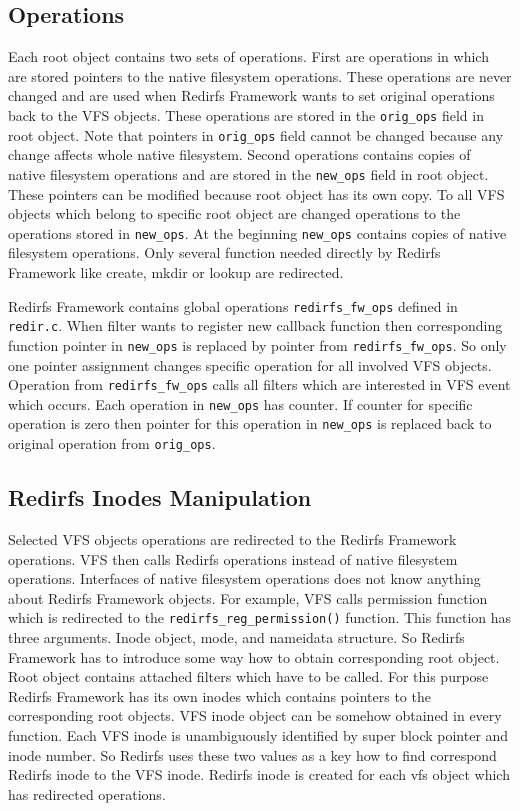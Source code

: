 \subsection{Operations}
Each root object contains two sets of operations. First are operations in which are
stored pointers to the native filesystem operations. These operations are
never changed and are used when Redirfs Framework wants to set original operations
back to the VFS objects. These operations are stored in the \texttt{orig\_ops} field
in root object. Note that pointers in \texttt{orig\_ops} field cannot be changed
because any change affects whole native filesystem. Second operations contains copies
of native filesystem operations and are stored in the \texttt{new\_ops} field in
root object. These pointers can be modified because root object has its own copy. 
To all VFS objects which belong to specific root object are changed operations to the
operations stored in \texttt{new\_ops}. At the beginning \texttt{new\_ops} contains
copies of native filesystem operations. Only several function needed directly by Redirfs
Framework like create, mkdir or lookup are redirected.

Redirfs Framework contains global operations \texttt{redirfs\_fw\_ops} defined in
\texttt{redir.c}. When filter wants to register new callback function then
corresponding function pointer in \texttt{new\_ops} is replaced by pointer
from \texttt{redirfs\_fw\_ops}. So only one pointer assignment changes
specific operation for all involved VFS objects. Operation from
\texttt{redirfs\_fw\_ops} calls all filters which are interested in VFS event which
occurs. Each operation in \texttt{new\_ops} has counter. If counter for specific
operation is zero then pointer for this operation in \texttt{new\_ops} is replaced
back to original operation from \texttt{orig\_ops}.

\subsection{Redirfs Inodes Manipulation}
Selected VFS objects operations are redirected to the Redirfs Framework operations.
VFS then calls Redirfs operations instead of native
filesystem operations. Interfaces of native filesystem operations does not know anything
about Redirfs Framework objects. For example, VFS calls permission function which is
redirected to the \texttt{redirfs\_reg\_permission()} function. This function has
three arguments. Inode object, mode, and nameidata structure. So Redirfs Framework has
to introduce some way how to obtain corresponding root object. Root object contains
attached filters which have to be called. For this purpose Redirfs Framework has its
own inodes which contains pointers to the corresponding root objects. VFS inode object
can be somehow obtained in every function. Each VFS inode is unambiguously identified
by super block pointer and inode number. So Redirfs uses these two values as a key
how to find correspond Redirfs inode to the VFS inode. Redirfs inode is created
for each vfs object which has redirected operations.

